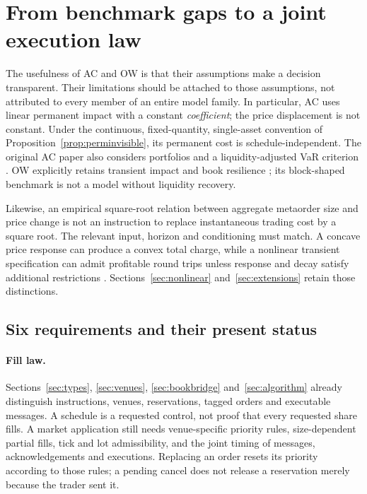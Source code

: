 \section{From benchmark gaps to a joint execution law}
\label{sec:realisticexecution}

The usefulness of AC and OW is that their assumptions make a decision
transparent. Their limitations should be attached to those assumptions,
not attributed to every member of an entire model family. In particular,
AC uses linear permanent impact with a constant \emph{coefficient}; the
price displacement is not constant. Under the continuous, fixed-quantity,
single-asset convention of Proposition~\ref{prop:perminvisible}, its
permanent cost is schedule-independent. The original AC paper also
considers portfolios and a liquidity-adjusted VaR criterion
\citep{almgren2001}. OW explicitly retains transient impact and book
resilience \citep{obizhaevawang2013}; its block-shaped benchmark is not a
model without liquidity recovery.

Likewise, an empirical square-root relation between aggregate metaorder
size and price change is not an instruction to replace instantaneous
trading cost by a square root. The relevant input, horizon and conditioning
must match. A concave price response can produce a convex total charge,
while a nonlinear transient specification can admit profitable round trips
unless response and decay satisfy additional restrictions
\citep{gatheral2010,curato2017}. Sections~\ref{sec:nonlinear}
and~\ref{sec:extensions} retain those distinctions.

\subsection{Six requirements and their present status}\label{sec:requirements}

\paragraph{Fill law.}
Sections~\ref{sec:types}, \ref{sec:venues}, \ref{sec:bookbridge}
and~\ref{sec:algorithm} already distinguish instructions, venues,
reservations, tagged orders and executable messages. A schedule is a
requested control, not proof that every requested share fills. A market
application still needs venue-specific priority rules, size-dependent
partial fills, tick and lot admissibility, and the joint timing of
messages, acknowledgements and executions. Replacing an order resets its
priority according to those rules; a pending cancel does not release a
reservation merely because the trader sent it.


